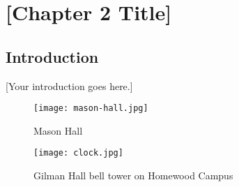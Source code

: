 \chapter{[Chapter 2 Title]}
\label{ch:chapter2}

\section{Introduction}

[Your introduction goes here.]

\begin{figure}[ht]
    \centering
    \texttt{[image: mason-hall.jpg]}
    \caption{Mason Hall}
    \label{fig:mason-hall}
\end{figure}

\begin{figure}[ht]
    \centering
    \texttt{[image: clock.jpg]}
    \caption{Gilman Hall bell tower on Homewood Campus}
    \label{fig:clock}
\end{figure}